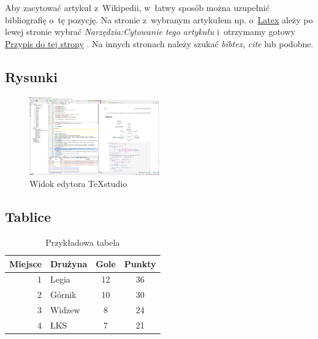 \documentclass[
    left=2.5cm,         %
    right=2.5cm,        %
    top=2.5cm,          %
    bottom=3cm,         %
    bindingoffset=6mm,  %
    nohyphenation=true %
]{eiti/eiti-thesis} %
\begin{document}
Aby zacytować artykuł z~Wikipedii, w~łatwy sposób można uzupełnić bibliografię o~tę pozycję. Na stronie z~wybranym artykułem np. o~\href{https://pl.wikipedia.org/wiki/LaTeX}{Latex} ależy po lewej stronie  wybrać 
\textit{Narzędzia:Cytowanie tego artykułu} i~otrzymamy gotowy 
\href{https://pl.wikipedia.org/w/index.php?title=Specjalna:Cytuj&page=LaTeX&id=58147357}{Przypis do tej strony} \cite{Wiki:Latex}. Na innych stronach należy szukać \textit{bibtex}, \textit{cite} lub podobne.

\subsection{Rysunki}
\begin{figure}[h]
	\centering
	\includegraphics[width=0.5\textwidth]{rysunek_1.jpg}
	\caption{\label{fig:rysunek_1}Widok edytora TeXstudio \cite{TeXstudio}}
\end{figure}
\FloatBarrier %

\subsection{Tablice}
\begin{table}[h]
	\begin{center}
		\caption{Przykładowa tabela}
		\label{tab:tabela_przyklad}
		\begin{tabular}{|r|l|c|c|}
			\hline 
			Miejsce & Drużyna & Gole & Punkty \\
			\hline \hline
			1 & Legia & 12 & 36 \\
			2 & Górnik & 10 & 30 \\
			3 & Widzew & 8 & 24\\
			4 & ŁKS & 7 & 21 \\ \hline
		\end{tabular}
	\end{center}
\end{table}
\FloatBarrier %
\end{document}
